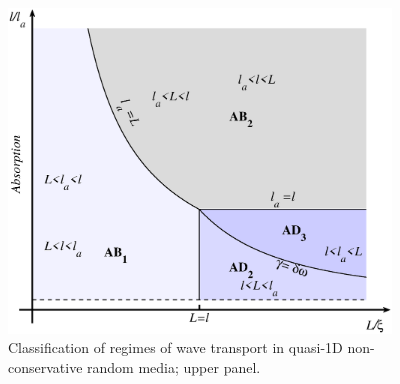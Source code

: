 
\begin{figure}
\vskip -0.2cm
\centerline{\includegraphics[width=4in]{chapters/Classification_of_regimes_of_wave_transport_in_non-conservative_random_media__J_Mod_Optics/pictures/fig1a_regimes_plot_upper}}
\vskip -0.2cm
\caption[Classification of regimes of wave transport in quasi-1D non-conservative random media; upper panel.]{Classification of regimes of wave transport in quasi-1D non-conservative random media; upper panel.}
\end{figure}

